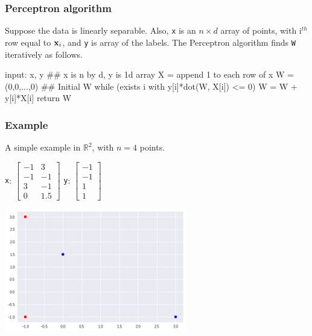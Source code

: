 \documentclass{beamer}
\theoremstyle{example}
\newcommand{\ttt}[1]{{\small\texttt{#1}}}
\begin{document}
\begin{frame}[fragile]
\frametitle{Perceptron algorithm}
Suppose the data is linearly separable. Also, \ttt{x} is an $n\times d$ array of points, with i$^{th}$ row equal to ${\bf x}_i$, and \ttt{y} is array of the labels. The Perceptron algorithm finds \ttt{W} iteratively as follows.

\begin{pseudo}
input: x, y  ## x is n by d, y is 1d array
X = append 1 to each row of x
W = (0,0,...,0)  ## Initial W
while (exists i with y[i]*dot(W, X[i]) <= 0){
    W = W + y[i]*X[i]
}
return W
\end{pseudo}

\end{frame}

\begin{frame}
    \frametitle{Example}
    A simple example in $\mathbb R^2$, with $n=4$ points.

    \begin{center}
    \ttt{x}: $\begin{bmatrix}-1 & 3 \\ -1 & -1 \\ 3 & -1 \\ 0 & 1.5\end{bmatrix}$  \qquad\qquad
    \ttt{y}: $\begin{bmatrix}-1 \\ -1 \\ 1 \\ 1\end{bmatrix}$
    \end{center}

    \centering
    \includegraphics[height=0.3\textheight]{../../Images/ex2_data_halfspace.png}
\end{frame}
\end{document}
